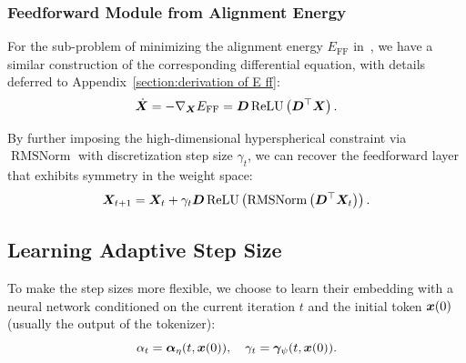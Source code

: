 

\subsubsection{Feedforward Module from Alignment Energy}
\label{section:section ff}
For the sub-problem of minimizing the alignment energy $E_{\text{FF}}$ in~, we have a similar construction of the corresponding differential equation, with details deferred to Appendix~\ref{section:derivation of E ff}:
\begin{equation}
\label{eq:9}
\dot{{\bm{X}}} = -\nabla_{{\bm{X}}} E_{\text{FF}} = {\bm{D}}\operatorname{ReLU}\left({\bm{D}}^\top{\bm{X}}\right).
\end{equation}

By further imposing the high-dimensional hyperspherical constraint via $\operatorname{RMSNorm}$ with discretization step size $\gamma_t$, we can recover the feedforward layer that exhibits symmetry in the weight space:
\begin{equation}
\label{eq:10}
{\bm{X}}_{t+1} = {\bm{X}}_t + \gamma_t {\bm{D}}\operatorname{ReLU}\left(\operatorname{RMSNorm}\left({\bm{D}}^\top{\bm{X}}_t \right)\right).  
\end{equation}

\subsection{Learning Adaptive Step Size}
To make the step sizes more flexible, we choose to learn their embedding with a neural network conditioned on the current iteration $t$ and the initial token ${\bm{x}}(0)$ (usually the output of the tokenizer):
\begin{equation}
\alpha_t = \bm{\alpha}_\eta (t, {\bm{x}}(0)),   
\quad\gamma_t = \bm{\gamma}_\psi (t, {\bm{x}}(0)).     \label{eq:12}
\end{equation}

